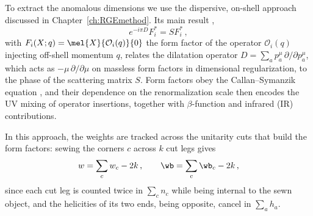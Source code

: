 To extract the anomalous dimensions we use the dispersive, on-shell approach discussed in Chapter~\ref{ch:RGEmethod}. 
Its main result \cite{Caron-Huot:2016cwu},
\begin{equation}
    e^{-i\pi D} F_i^* = S F_i^*\,,
    \label{eq:chw}
\end{equation}
with $F_i(X;q) = \mel{X}{\mathcal O_i(q)}{0}$ the form factor of the operator $\mathcal O_i(q)$ injecting off-shell momentum $q$, relates the dilatation operator $D=\sum_a p_a^\mu \, \partial/\partial p_a^\mu$, which acts as $-\mu \, \partial/\partial\mu$ on massless form factors in dimensional regularization, to the phase of the scattering matrix $S$. 
Form factors obey the Callan--Symanzik equation \cite{Callan:1970yg,Symanzik:1970rt},
and their dependence on the renormalization scale then encodes the UV mixing of operator insertions, together with $\beta$-function and infrared (IR) contributions.

In this approach, the weights are tracked across the unitarity cuts that build the form factors: sewing the corners $c$ across $k$ cut legs gives
\begin{equation}
\label{eq:sewing}
    w = \sum_c w_c - 2k\,,
    \qquad
    \wb = \sum_c \wb_c - 2k\,,
\end{equation}
since each cut leg is counted twice in $\sum_c n_c$ while being internal to the sewn object, and the helicities of its two ends, being opposite, cancel in $\sum_a h_a$.


